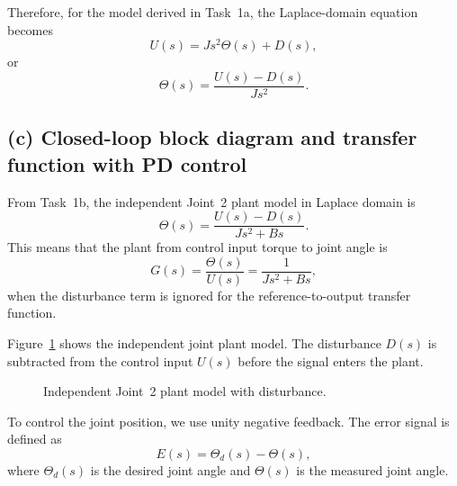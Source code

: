 \documentclass{article}
\begin{document}
Therefore, for the model derived in Task~1a, the Laplace-domain equation becomes
\begin{equation}
    U(s) = Js^2\Theta(s) + D(s),
\end{equation}
or
\begin{equation}
    \Theta(s) = \frac{U(s)-D(s)}{Js^2}.
\end{equation}

\subsection*{(c) Closed-loop block diagram and transfer function with PD control}

From Task~1b, the independent Joint~2 plant model in Laplace domain is
\begin{equation}
    \Theta(s) = \frac{U(s)-D(s)}{Js^2+Bs}.
    \label{eq:plant_disturbance}
\end{equation}
This means that the plant from control input torque to joint angle is
\begin{equation}
    G(s) = \frac{\Theta(s)}{U(s)} = \frac{1}{Js^2+Bs},
    \label{eq:plant_G}
\end{equation}
when the disturbance term is ignored for the reference-to-output transfer function.

Figure~\ref{fig:plant_model} shows the independent joint plant model. The disturbance $D(s)$ is subtracted from the control input $U(s)$ before the signal enters the plant.

\begin{figure}[H]
    \centering
    \caption{Independent Joint~2 plant model with disturbance.}
    \label{fig:plant_model}
\end{figure}

To control the joint position, we use unity negative feedback. The error signal is defined as
\begin{equation}
    E(s) = \Theta_d(s) - \Theta(s),
\end{equation}
where $\Theta_d(s)$ is the desired joint angle and $\Theta(s)$ is the measured joint angle.
\end{document}
